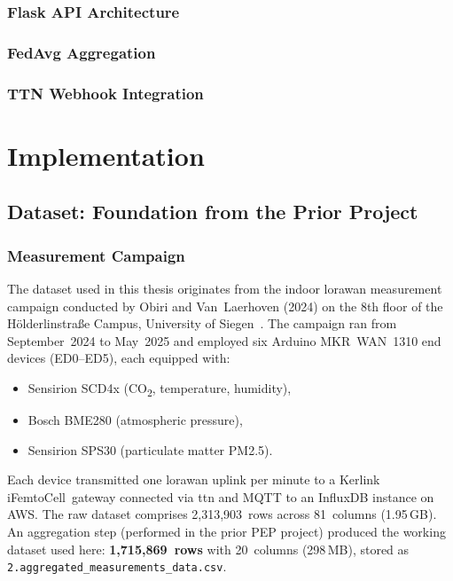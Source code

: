 \documentclass[12pt, a4paper, twoside, openright]{report}
\begin{document}
\subsubsection{Flask API Architecture}

\subsubsection{FedAvg Aggregation}

\subsubsection{TTN Webhook Integration}


\section{Implementation}
\label{sec:implementation}

\subsection{Dataset: Foundation from the Prior Project}
\label{sec:dataset}

\subsubsection{Measurement Campaign}
The dataset used in this thesis originates from the indoor \gls{lorawan} measurement campaign conducted by Obiri and Van~Laerhoven (2024) on the 8th floor of the H\"olderlinstra{\ss}e Campus, University of Siegen~\cite{obiri2024comprehensive}. The campaign ran from September~2024 to May~2025 and employed six Arduino MKR~WAN~1310 end devices (ED0--ED5), each equipped with:
\begin{itemize}
  \item Sensirion SCD4x (CO\textsubscript{2}, temperature, humidity),
  \item Bosch BME280 (atmospheric pressure),
  \item Sensirion SPS30 (particulate matter PM2.5).
\end{itemize}
Each device transmitted one \gls{lorawan} uplink per minute to a Kerlink iFemtoCell~gateway connected via \gls{ttn} and MQTT to an InfluxDB instance on AWS. The raw dataset comprises 2,313,903~rows across 81~columns (1.95\,GB). An aggregation step (performed in the prior PEP project) produced the working dataset used here: \textbf{1,715,869~rows} with 20~columns (298\,MB), stored as \texttt{2.aggregated\_measurements\_data.csv}.
\end{document}
